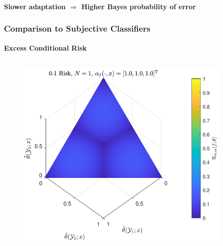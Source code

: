 \documentclass[aspectratio=169]{beamer}
\begin{document}
\begin{frame}
\begin{columns}[T]
\begin{column}{.5\linewidth}
\end{column}

\end{columns}

\vspace{2em}
\centering
\textbf{Slower adaptation $\Rightarrow$ Higher Bayes probability of error}

\end{frame}



\begin{frame}
\frametitle{Comparison to Subjective Classifiers}
\framesubtitle{Excess Conditional Risk}

\vspace{-1em}
\begin{columns}[c]

\begin{column}{.5\linewidth}

\begin{figure}
\centering
\includegraphics[width=0.8\linewidth]{Risk_cond_ex_01_Dir_theta__uni.pdf}
\label{fig:Risk_cond_ex_01_Dir_theta__uni}
\end{figure}

\end{column}

\begin{column}{.5\linewidth}


\end{column}
\end{columns}
\end{frame}
\end{document}
